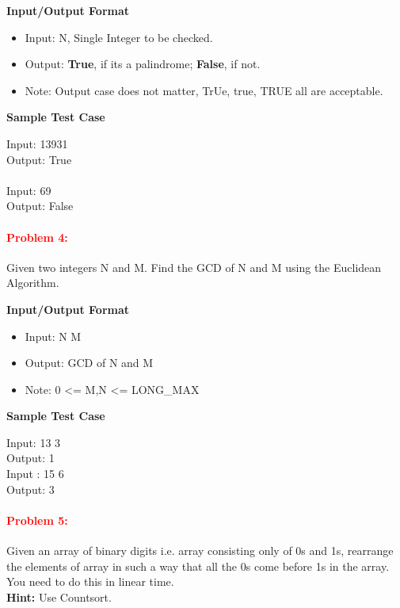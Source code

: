 \documentclass[a4paper,11pt]{article} %
\begin{document}
\textbf{Input/Output Format}
\begin{itemize}
    \item  Input: N, Single Integer to be checked.
    \item  Output: \textbf{True}, if its a palindrome; \textbf{False}, if not.
    \item  Note: Output case does not matter, TrUe, true, TRUE all are acceptable.
\end{itemize}


\textbf{Sample Test Case}

Input:  13931\\
Output: True\\
\\
Input: 69\\
Output: False\\

\vspace*{0.3cm}

\paragraph{\textcolor{red}{Problem 4: }}
Given two integers N and M. Find the GCD of N and M using the Euclidean Algorithm.

\textbf{Input/Output Format}
\begin{itemize}
    \item  Input: N M
    \item  Output: GCD of N and M
    \item  Note: 0 <= M,N <= LONG\_MAX
\end{itemize}

\textbf{Sample Test Case}

Input:  13 3 \\
Output: 1\\

Input : 15 6\\
Output: 3\\
\vspace*{0.3cm}


\paragraph{\textcolor{red}{Problem 5: }}
Given an array of binary digits i.e. array consisting only of 0s and 1s, rearrange the elements of array in such a way that all the 0s come before 1s in the array. You need to do this in linear time.\\
\textbf{Hint: } Use Countsort.
\end{document}
